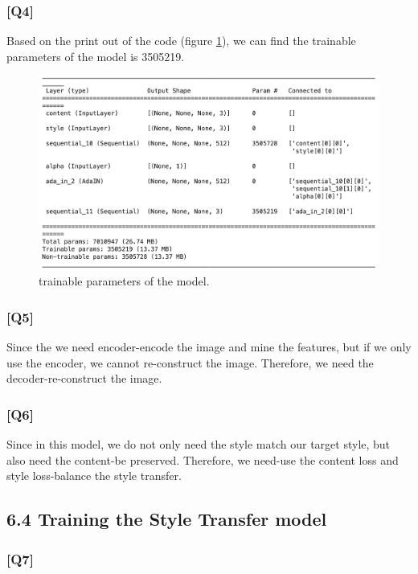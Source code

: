 \documentclass{article}
\begin{document}
\subsubsection*{[Q4]}
Based on the print out of the code (figure \ref{fig:trainable_parameters}), we can find the trainable parameters of the model is 3505219.

\begin{figure}[!ht]
    \centering
    \includegraphics[width=\textwidth]{./pic/trainable_para_model1.png}
    \caption{trainable parameters of the model.}
    \label{fig:trainable_parameters}
\end{figure}

\subsubsection*{[Q5]}
Since the we need encoder-encode the image and mine the features, but if we only use the encoder, we cannot re-construct the image. 
Therefore, we need the decoder-re-construct the image.

\subsubsection*{[Q6]}
Since in this model, we do not only need the style match our target style, but also need the content-be preserved.
Therefore, we need-use the content loss and style loss-balance the style transfer.

\subsection*{6.4 Training the Style Transfer model}

\subsubsection*{[Q7]}
\end{document}
